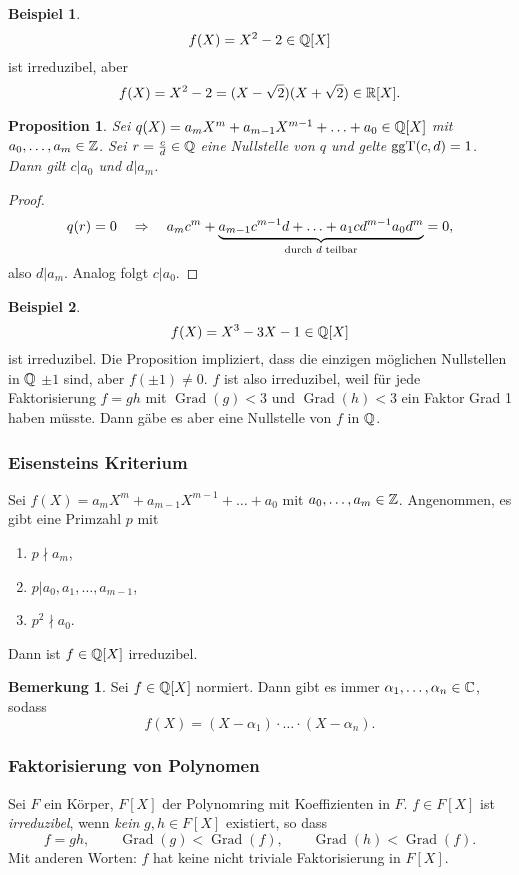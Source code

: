 \documentclass[
 a4paper,
 12pt,
 parskip=half
 ]{scrreprt}
\theoremstyle{plain}
\newtheorem*{prp*}{Proposition}
\theoremstyle{definition}
\newtheorem*{rmrk*}{Bemerkung}
\newtheorem*{exmp*}{Beispiel}
\DeclareMathOperator{\Grad}{Grad}
\numberwithin{equation}{chapter}
\numberwithin{thm}{chapter}
\begin{document}
\begin{exmp*}
  \[ f(X) = X^2 - 2 \in \mathbb{Q}[X] \]
  ist irreduzibel, aber
  \[ f(X) = X^2 - 2 = (X - \sqrt{2})(X + \sqrt{2}) \in \mathbb{R}[X].\]
\end{exmp*}

\begin{prp*}
  Sei $q(X) = a_m X^m + a_{m-1} X^{m-1} + \ldots + a_0 \in \mathbb{Q}[X]$ mit $a_0,
  \ldots, a_m \in \mathbb{Z}$. Sei $r = \frac{c}{d} \in \mathbb{Q}$ eine Nullstelle von
  $q$ und gelte $\operatorname{ggT}(c,d) = 1$. Dann gilt $c|a_0$ und $d | a_m$.
\end{prp*}

\begin{proof}
  \[ q(r) = 0 \quad \Rightarrow \quad
    a_m c^m + \underbrace{a_{m-1} c^{m-1} d + \ldots + a_1 c d^{m-1} a_0
      d^m}_{\text{durch $d$ teilbar}} = 0, \]
  also $d | a_m$. Analog folgt $c | a_0$.
\end{proof}

\begin{exmp*}
  \[ f(X) = X^3 - 3X - 1 \in \mathbb{Q}[X] \]
  ist irreduzibel. Die Proposition impliziert, dass die einzigen möglichen
  Nullstellen in $\mathbb{Q}$ $\pm 1$ sind, aber $f( \pm 1 ) \ne 0$. $f$ ist also
  irreduzibel, weil für jede Faktorisierung $f = gh$ mit $\Grad(g) < 3$ und
  $\Grad(h) < 3$ ein Faktor Grad 1 haben müsste. Dann gäbe es aber eine
  Nullstelle von $f$ in $\mathbb{Q}$.
\end{exmp*}

\subsubsection*{Eisensteins Kriterium}
  Sei $f(X) = a_m X^m + a_{m-1} X^{m-1} + \ldots + a_0$ mit $a_0, \ldots, a_m
  \in \mathbb{Z}$. Angenommen, es gibt eine Primzahl $p$ mit
  \begin{enumerate}
  \item $p \nmid a_m$,
  \item $p | a_0, a_1, \ldots, a_{m-1}$,
  \item $p^2 \nmid a_0$.
  \end{enumerate}
  Dann ist $f \in \mathbb{Q}[X]$ irreduzibel.

\begin{rmrk*}
  Sei $f \in \mathbb{Q}[X]$ normiert. Dann gibt es immer $\alpha_1, \ldots, \alpha_n \in
  \mathbb{C}$, sodass
  \[ f(X) = (X-\alpha_1) \cdot \ldots \cdot (X-\alpha_n). \]
\end{rmrk*}

\subsubsection*{Faktorisierung von Polynomen}
Sei $F$ ein Körper, $F[X]$ der Polynomring mit Koeffizienten in $F$. $f \in
F[X]$ ist \emph{irreduzibel}, wenn \emph{kein} $g,h \in F[X]$ existiert, so dass
\[ f = gh, \qquad \Grad(g) < \Grad(f), \qquad \Grad(h) < \Grad(f). \]
Mit anderen Worten: $f$ hat keine nicht triviale Faktorisierung in $F[X]$.
\end{document}
